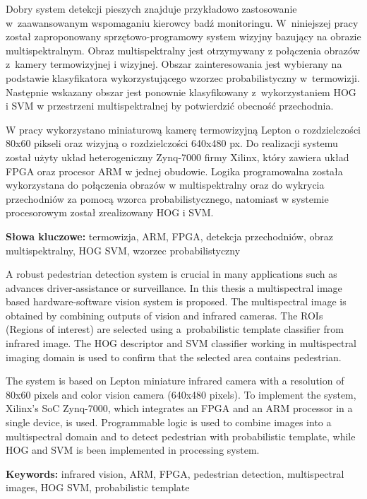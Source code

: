 \documentclass[12pt]{aghdpl}
\author{Tomasz Kańka}
\date{2018}
\newenvironment{abstractpage}
{\cleardoublepage\vspace*{\fill}\thispagestyle{empty} }
{\vfill\cleardoublepage}
\renewenvironment{abstract}[1]
{\bigskip\selectlanguage{#1}%
	\begin{center}\bfseries\abstractname\end{center}}
{\par\bigskip}
\begin{document}
\titlepages

\begin{abstractpage}
	\begin{abstract}{polish}
Dobry system detekcji pieszych znajduje przykładowo zastosowanie w~zaawansowanym wspomaganiu kierowcy badź monitoringu. 
W~niniejszej pracy został zaproponowany sprzętowo-programowy system wizyjny bazujący na obrazie multispektralnym. 
Obraz multispektralny jest otrzymywany z połączenia obrazów z~kamery termowizyjnej i wizyjnej.   
Obszar zainteresowania jest wybierany na podstawie klasyfikatora wykorzystującego wzorzec probabilistyczny w~termowizji.  
Następnie wskazany obszar jest ponownie klasyfikowany z~wykorzystaniem HOG i SVM w przestrzeni multispektralnej by potwierdzić obecność przechodnia. 

W pracy wykorzystano miniaturową kamerę termowizyjną Lepton o rozdzielczości 80x60 pikseli oraz wizyjną o rozdzielczości 640x480 px. Do realizacji systemu został użyty układ heterogeniczny Zynq-7000 firmy Xilinx, który zawiera układ FPGA oraz procesor ARM w jednej obudowie. Logika programowalna została wykorzystana do połączenia obrazów w multispektralny oraz do wykrycia przechodniów za pomocą wzorca probabilistycznego, natomiast w systemie procesorowym został zrealizowany HOG i SVM.
		
\textbf{Słowa kluczowe:} 
termowizja, ARM, FPGA, detekcja przechodniów, obraz multispektralny, HOG SVM, wzorzec probabilistyczny
		
	\end{abstract}
	
	\begin{abstract}{english}
A robust pedestrian detection system is crucial in many applications such as advances driver-assistance or surveillance. 
In this thesis a multispectral image based hardware-software vision system is proposed. 
The multispectral image is obtained by combining outputs of vision and infrared cameras.
The ROIs (Regions of interest) are selected using a~probabilistic template classifier from infrared image. 
The HOG descriptor and SVM classifier working in multispectral imaging domain is used to confirm that the selected area contains pedestrian.

The system is based on Lepton miniature infrared camera with a resolution of 80x60 pixels and color vision camera (640x480 pixels). To implement the system, Xilinx's SoC Zynq-7000, which integrates an FPGA and an ARM processor in a single device, is used. Programmable logic is used to combine images into a multispectral domain and to detect pedestrian with probabilistic template, while HOG and SVM  is been implemented in processing system.
		
		\textbf{Keywords:} 
infrared vision, ARM, FPGA, pedestrian detection, multispectral images, HOG SVM, probabilistic template	
	\end{abstract}
\end{abstractpage}
\end{document}

